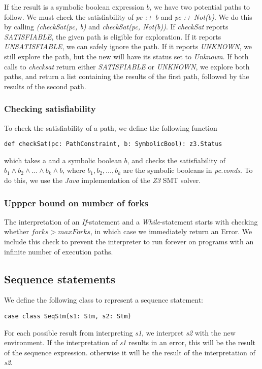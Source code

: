 \noindent If the result is a symbolic boolean expression $b$, we have two potential paths to follow. We must check the satisfiability of \textsl{pc :+ b} and \textsl{pc :+ Not(b)}. We do this by calling \textsl{(checkSat(pc, b)} and \textsl{checkSat(pc, Not(b))}. If \textsl{checkSat} reports \textsl{SATISFIABLE}, the given path is eligible for exploration. If it reports \textsl{UNSATISFIABLE}, we can safely ignore the path. If it reports \textsl{UNKNOWN}, we still explore the path, but the new \pc will have its status set to \textsl{Unknown}.
 If both calls to \textsl{checksat} return either \textsl{SATISFIABLE} or \textsl{UNKNOWN}, we explore both paths, and return a list containing the results of the first path, followed by the results of the second path.

\subsubsection{Checking satisfiability}
To check the satisfiability of a path, we define the following function

\begin{lstlisting}[style=simple]
def checkSat(pc: PathConstraint, b: SymbolicBool): z3.Status
\end{lstlisting}
which takes a \pc  and a symbolic boolean $b$, and checks the satisfiability of $b_1 \land b_2 \land \ldots \land b_k \land b$, where $b_1, b_2, \ldots, b_k$ are the symbolic booleans in \textsl{pc.conds}. To do this, we use the \textsl{Java} implementation of the \textsl{Z3} SMT solver. 
 
\subsubsection{Uppper bound on number of forks}

The interpretation of an \textsl{If}-statement and a \textsl{While}-statement starts with checking whether $forks > maxForks$, in which case we immediately return an Error. We include this check to prevent the interpreter to run forever on programs with an infinite number of execution paths. 

\iffalse
\subsection{Sequence statements}

We define the following class to represent a sequence statement:
\begin{lstlisting}[style=simple]
	case class SeqStm(s1: Stm, s2: Stm)
\end{lstlisting}
For each possible result from interpreting \textsl{s1}, we interpret \textsl{s2} with the new environment. If the interpretation of \textsl{s1} results in an error, this will be the result of the sequence expression. otherwise it will be the result of the interpretation of \textsl{s2}. 	

